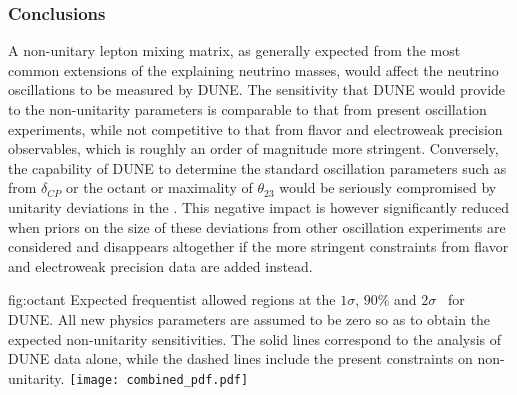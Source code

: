 \subsubsection{Conclusions}
A non-unitary lepton mixing matrix, as generally expected from the most common extensions of the   explaining neutrino masses, would affect the neutrino oscillations to be measured by DUNE. The sensitivity that DUNE would provide to the non-unitarity parameters is comparable to that from present oscillation experiments, while not competitive to that from flavor and electroweak precision observables, which is roughly an order of magnitude more stringent. Conversely, the capability of DUNE to determine the standard oscillation parameters such as  from $\delta_{CP}$ or the octant or maximality of $\theta_{23}$ would be seriously compromised by unitarity deviations in the . This negative impact is however significantly reduced when priors on the size of these deviations from other oscillation experiments are considered and disappears altogether if the more stringent constraints from flavor and electroweak precision data are added instead.

\begin{dunefigure}
{fig:octant}
{Expected frequentist allowed regions at the $1 \sigma$, $90\%$ and $2\sigma$ \ for DUNE. All new physics parameters are assumed to be zero so as to obtain the expected non-unitarity sensitivities. The solid lines correspond to the analysis of DUNE data alone, while the dashed lines include the present constraints on non-unitarity.}
 \texttt{[image: combined\_pdf.pdf]} 
\end{dunefigure}

